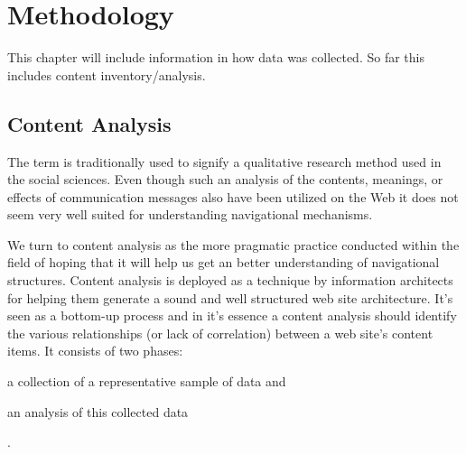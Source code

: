 \chapter{Methodology}
\label{chapter:methodology}

This chapter will include information in how data was collected. So far this
includes content inventory/analysis.

\section{Content Analysis}

The term  is traditionally used to signify a
qualitative research method used in the social sciences.
Even though such an analysis of the contents, meanings, or effects of
communication messages also have been utilized on the Web \citep{weare00}
it does not seem very well suited for understanding navigational mechanisms.

We turn to content analysis as the more pragmatic practice conducted within
the field of %
 hoping that it will help us get an better understanding of navigational
structures.
Content analysis is deployed as a technique by information architects for
helping them generate a sound and well structured web site architecture.
It's seen as a bottom-up process and
in it's essence a content analysis should identify the various
relationships (or lack of correlation) between a web site's content items.
It consists of two phases:
\begin{inparaenum}[(i)]
  \item a collection of a representative sample of data and
  \item an analysis of this collected data
\end{inparaenum}
\citep[pp.~241--243]{morville06}.

